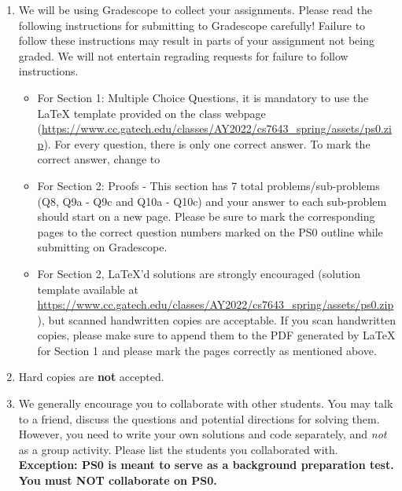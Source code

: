 \documentclass[11pt,english, answers]{exam}
\begin{document}
\begin{enumerate}
 \item We will be using Gradescope to collect your assignments.  Please read the following instructions for submitting to Gradescope carefully! Failure to follow these instructions may result in parts of your assignment not being graded. We will not entertain regrading requests for failure to follow instructions.
      \begin{itemize}
        \item
          For Section 1: Multiple Choice Questions, it is mandatory to use the {\LaTeX} template provided on the class webpage (\url{https://www.cc.gatech.edu/classes/AY2022/cs7643_spring/assets/ps0.zip}).
           For every question, there is only one correct answer. To mark the correct answer, change \codeword{\choice} to \codeword{\CorrectChoice}

           \item
                For Section 2: Proofs - This section has 7 total problems/sub-problems (Q8, Q9a - Q9c and Q10a - Q10c) and your answer to each sub-problem should start on a new page. Please be sure to mark the corresponding pages to the correct question numbers marked on the PS0 outline while submitting on Gradescope. 
           \item For Section 2, \LaTeX'd  solutions are strongly encouraged (solution template
           available at \\
           \url{https://www.cc.gatech.edu/classes/AY2022/cs7643_spring/assets/ps0.zip}),
           but scanned handwritten copies are acceptable. If you scan handwritten copies, please make sure to append them to the PDF generated by {\LaTeX} for Section 1 and please mark the pages correctly as mentioned above. 

      \end{itemize}

 \item Hard copies are \textbf{not} accepted.
\item We generally encourage you to collaborate with other students. You may talk to a friend,
discuss the questions and potential directions for solving them. However, you need to write
your own solutions and code separately, and \emph{not} as a group activity.
Please list the students you collaborated with. \\
\textbf{Exception: PS0 is meant to serve as a background preparation test. You must NOT collaborate on PS0.}

\end{enumerate}

\pagebreak


%
%
\end{document}
